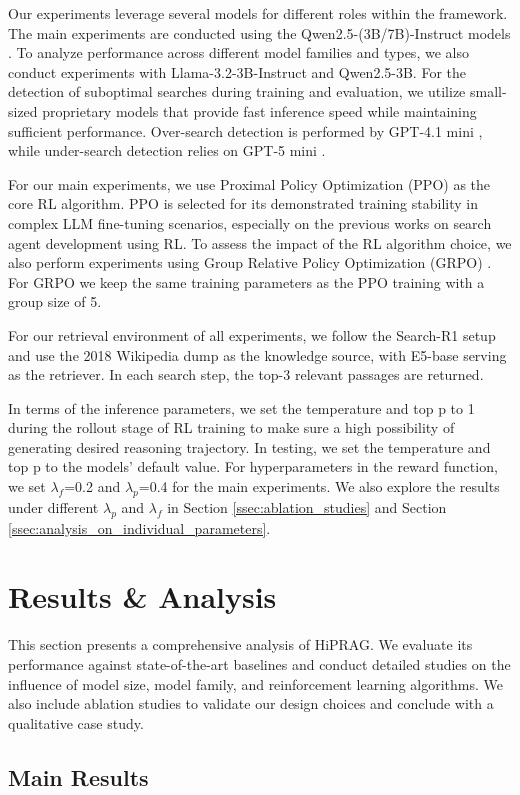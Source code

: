 \documentclass{article}
\begin{document}
Our experiments leverage several models for different roles within the framework. The main experiments are conducted using the Qwen2.5-(3B/7B)-Instruct models . To analyze performance across different model families and types, we also conduct experiments with Llama-3.2-3B-Instruct and Qwen2.5-3B. For the detection of suboptimal searches during training and evaluation, we utilize small-sized proprietary models that provide fast inference speed while maintaining sufficient performance. Over-search detection is performed by GPT-4.1 mini , while under-search detection relies on GPT-5 mini .

For our main experiments, we use Proximal Policy Optimization (PPO) as the core RL algorithm. PPO is selected for its demonstrated training stability in complex LLM fine-tuning scenarios, especially on the previous works on search agent development using RL. To assess the impact of the RL algorithm choice, we also perform experiments using Group Relative Policy Optimization (GRPO) . For GRPO we keep the same training parameters as the PPO training with a group size of 5.

For our retrieval environment of all experiments, we follow the Search-R1 setup and use the 2018 Wikipedia dump as the knowledge source, with E5-base serving as the retriever. In each search step, the top-3 relevant passages are returned.

In terms of the inference parameters, we set the temperature and top p to 1 during the rollout stage of RL training to make sure a high possibility of generating desired reasoning trajectory. In testing, we set the temperature and top p to the models' default value. For hyperparameters in the reward function, we set $\lambda_f$=0.2 and $\lambda_p$=0.4 for the main experiments. We also explore the results under different $\lambda_p$ and $\lambda_f$ in Section \ref{ssec:ablation_studies} and Section \ref{ssec:analysis_on_individual_parameters}.

\section{Results \& Analysis}
This section presents a comprehensive analysis of HiPRAG. We evaluate its performance against state-of-the-art baselines and conduct detailed studies on the influence of model size, model family, and reinforcement learning algorithms. We also include ablation studies to validate our design choices and conclude with a qualitative case study.

\subsection{Main Results}
\end{document}
